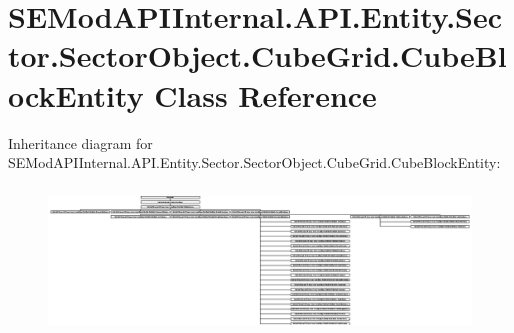 \hypertarget{class_s_e_mod_a_p_i_internal_1_1_a_p_i_1_1_entity_1_1_sector_1_1_sector_object_1_1_cube_grid_1_1_cube_block_entity}{}\section{S\+E\+Mod\+A\+P\+I\+Internal.\+A\+P\+I.\+Entity.\+Sector.\+Sector\+Object.\+Cube\+Grid.\+Cube\+Block\+Entity Class Reference}
\label{class_s_e_mod_a_p_i_internal_1_1_a_p_i_1_1_entity_1_1_sector_1_1_sector_object_1_1_cube_grid_1_1_cube_block_entity}
Inheritance diagram for S\+E\+Mod\+A\+P\+I\+Internal.\+A\+P\+I.\+Entity.\+Sector.\+Sector\+Object.\+Cube\+Grid.\+Cube\+Block\+Entity\+:\begin{figure}[H]
\begin{center}
\leavevmode
\includegraphics[height=3.920145cm]{class_s_e_mod_a_p_i_internal_1_1_a_p_i_1_1_entity_1_1_sector_1_1_sector_object_1_1_cube_grid_1_1_cube_block_entity}
\end{center}
\end{figure}
